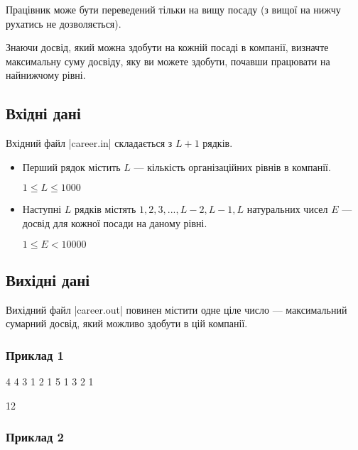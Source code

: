 \documentclass[12pt,a4paper]{article}
\begin{document}
Працівник може бути переведений тільки на вищу посаду (з вищої на нижчу рухатись не дозволяється).

Знаючи досвід, який можна здобути на кожній посаді в компанії, визначте максимальну суму досвіду, яку ви можете здобути, почавши працювати на найнижчому рівні.


\subsection*{Вхідні дані}

Вхідний файл |career.in| складається з \(L + 1\) рядків.

\begin{itemize}
    \item Перший рядок містить \(L\) --- кількість організаційних рівнів в компанії.

          \(1 \leq L \leq 1000\)

    \item Наступні \(L\) рядків містять \(1, 2, 3, ..., L-2, L-1, L\) натуральних чисел \(E\) --- досвід для кожної посади на даному рівні.

          \(1 \leq E < 10000\)
\end{itemize}


\subsection*{Вихідні дані}

Вихідний файл |career.out| повинен містити одне ціле число --- максимальний сумарний досвід, який можливо здобути в цій компанії.


\pagebreak


\subsubsection*{Приклад 1}

\textbf{}

\begin{codeblock}
4
4
3 1
2 1 5
1 3 2 1
\end{codeblock}

\textbf{}

\begin{codeblock}
12
\end{codeblock}


\subsubsection*{Приклад 2}
\end{document}
